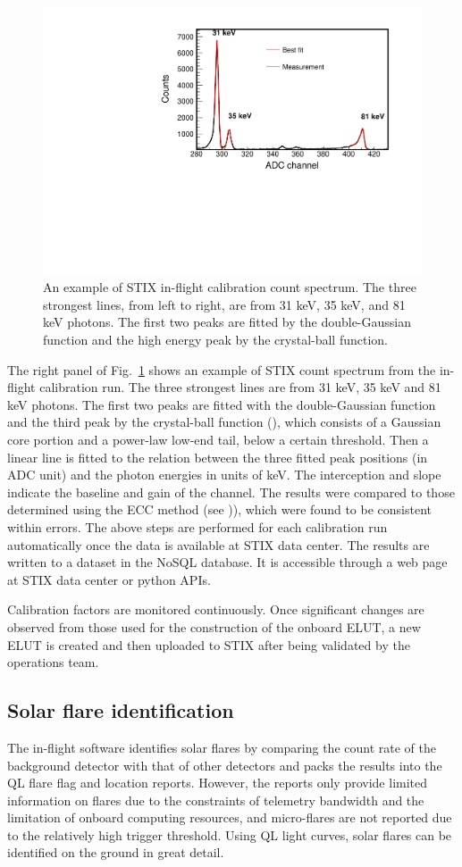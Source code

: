 \documentclass[referee]{aa} %
\begin{document}
\begin{figure}
 \centering
  \includegraphics[width=0.8\linewidth]{figures/cal-fit.pdf}
  \caption{An example of STIX in-flight calibration count spectrum.
  The three strongest lines, from left to right, are from 31 keV, 35 keV, and 81 keV
  photons. The first two peaks are fitted by the double-Gaussian function and the high energy peak by  
  the crystal-ball function. }
    \label{fig:cal-fit}
\end{figure}
The right panel of Fig.~\ref{fig:cal-fit} shows 
an example of STIX count spectrum from the in-flight calibration run.  
The three strongest lines are from 31 keV, 35 keV and 81 keV photons. 
The first two peaks are fitted with the double-Gaussian function and the third peak
by the crystal-ball function (\cite{crsystallball}),  which consists of a Gaussian core portion 
and a power-law low-end tail, below a certain threshold.
Then a linear line is fitted to the relation between
the three fitted peak positions (in ADC unit) and the photon energies in units of keV.  
The interception and slope indicate the baseline and gain of the channel. 
The results were compared to those determined using the ECC method (see \cite{ecc,ecc2})), 
 which were found to be consistent within errors.
The above steps are performed for each calibration run automatically 
once the data is available at STIX data center.  The results are written to a
 dataset in the NoSQL database.  It is accessible through a web page at STIX data center or python APIs.

Calibration factors are monitored continuously. Once significant changes are 
observed from those used for the construction of  the onboard ELUT, 
 a new ELUT is created and then uploaded to STIX after being validated by the operations team. 

\subsection{Solar flare identification}
The in-flight software identifies solar flares by comparing  the count rate of 
the background detector with that of other detectors 
 and packs the results into the QL flare flag and location reports.
However,  the reports only provide limited information on flares due to the constraints of telemetry 
bandwidth and the limitation of onboard computing resources, and micro-flares are not 
reported due to the relatively high trigger threshold.
Using QL light curves, solar flares can be identified on the ground in great detail.
\end{document}
